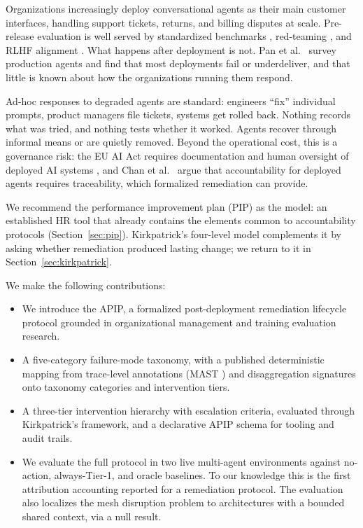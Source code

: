 \documentclass[conference]{IEEEtran}
\begin{document}
Organizations increasingly deploy conversational agents as their main customer
interfaces, handling support tickets, returns, and billing disputes at scale.
Pre-release evaluation is well served by standardized benchmarks
\cite{liang2022}, red-teaming \cite{ganguli2022}, and RLHF alignment
\cite{ouyang2022}. What happens after deployment is not. Pan et al.\
\cite{pan2025} survey production agents and find that most deployments fail or
underdeliver, and that little is known about how the organizations running them
respond.

Ad-hoc responses to degraded agents are standard: engineers ``fix'' individual
prompts, product managers file tickets, systems get rolled back. Nothing
records what was tried, and nothing tests whether it worked. Agents recover
through informal means or are quietly removed. Beyond the operational cost,
this is a governance risk: the EU AI Act requires documentation and human
oversight of deployed AI systems \cite{euaiact}, and Chan et al.\
\cite{chan2024} argue that accountability for deployed agents requires
traceability, which formalized remediation can provide.

We recommend the performance improvement plan (PIP) as the model: an
established HR tool that already contains the elements common to
accountability protocols (Section~\ref{sec:pip}). Kirkpatrick's
four-level model \cite{kirkpatrick1994} complements it by asking whether
remediation produced lasting change; we return to it in
Section~\ref{sec:kirkpatrick}.

We make the following contributions:

\begin{itemize}
  \item We introduce the APIP, a formalized post-deployment remediation
  lifecycle protocol grounded in organizational management and training
  evaluation research.

  \item A five-category failure-mode taxonomy, with a published deterministic
  mapping from trace-level annotations (MAST \cite{cemri2025}) and
  disaggregation signatures onto taxonomy categories and intervention tiers.

  \item A three-tier intervention hierarchy with escalation criteria, evaluated
  through Kirkpatrick's framework, and a declarative APIP schema for tooling
  and audit trails.

  \item We evaluate the full protocol in two live multi-agent environments
  against no-action, always-Tier-1, and oracle baselines. To our knowledge this is the first
  attribution accounting reported for a remediation protocol. The evaluation
  also localizes the mesh disruption problem to architectures with a bounded
  shared context, via a null result.
\end{itemize}
\end{document}
